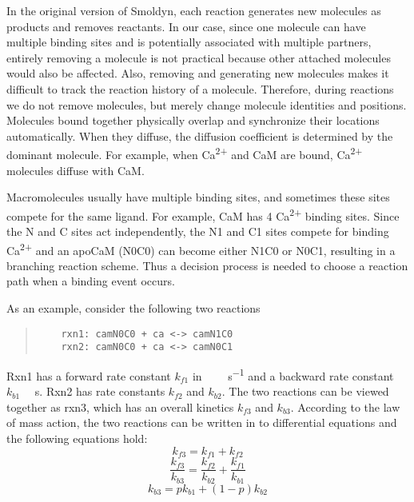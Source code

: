 \documentclass[10pt,letterpaper]{article}
\begin{document}
In the original version of Smoldyn, each reaction generates new molecules as products and removes reactants. In our case, since one molecule can have multiple binding sites and is potentially associated with multiple partners, entirely removing a molecule is not practical because other attached molecules would also be affected. Also, removing and generating new molecules makes it difficult to track the reaction history of a molecule. Therefore, during reactions we do not remove molecules, but merely change molecule identities and positions. Molecules bound together physically overlap and synchronize their locations automatically. When they diffuse, the diffusion coefficient is determined by the dominant molecule. For example, when Ca\textsuperscript{2+} and CaM are bound, Ca\textsuperscript{2+} molecules diffuse with CaM.

Macromolecules usually have multiple binding sites, and sometimes these sites compete for the same ligand. For example, CaM has 4 Ca\textsuperscript{2+} binding sites. Since the N and C sites act independently, the N1 and C1 sites compete for binding Ca\textsuperscript{2+} and an apoCaM (N0C0) can become either N1C0 or N0C1, resulting in a branching reaction scheme. Thus a decision process is needed to choose a reaction path when a binding event occurs. 

As an example, consider the following two reactions
\begin{quote}
\begin{verbatim}
	rxn1: camN0C0 + ca <-> camN1C0
	rxn2: camN0C0 + ca <-> camN0C1
\end{verbatim}
\end{quote}

Rxn1 has a forward rate constant $k_{f1}$ in \SI{}{\per\micro\Molar\per\s} and a backward rate constant $k_{b1}$ \SI{}{\per\s}. Rxn2 has rate constants $k_{f2}$ and $k_{b2}$. The two reactions can be viewed together as rxn3, which has an overall kinetics $k_{f3}$ and $k_{b3}$. According to the law of mass action, the two reactions can be written in to differential equations and the following equations hold:
\begin{equation}
	k_{f3}=k_{f1}+k_{f2}
\end{equation}
\begin{equation}\frac{k_{f3}}{k_{b3}}=\frac{k_{f2}}{k_{b2}} + \frac{k_{f1}}{k_{b1}}\end{equation}
\begin{equation}k_{b3}=pk_{b1} + (1-p)k_{b2}\end{equation}
\end{document}
